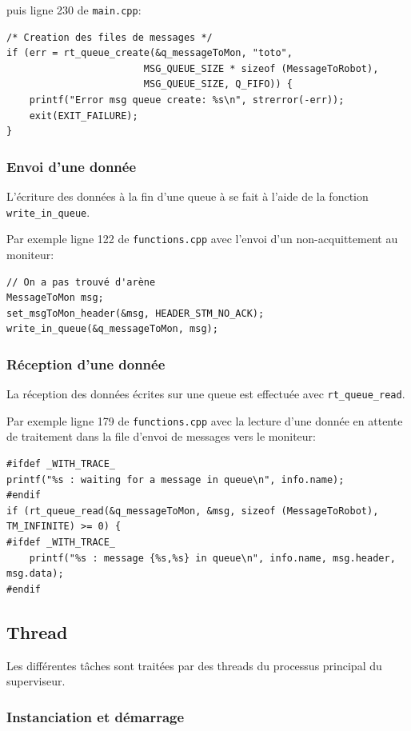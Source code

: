\documentclass[11pt, a4paper]{paper}
\begin{document}
puis ligne 230 de {\tt main.cpp}:
\begin{verbatim}
/* Creation des files de messages */
if (err = rt_queue_create(&q_messageToMon, "toto",
                        MSG_QUEUE_SIZE * sizeof (MessageToRobot),
                        MSG_QUEUE_SIZE, Q_FIFO)) {
    printf("Error msg queue create: %s\n", strerror(-err));
    exit(EXIT_FAILURE);
}
\end{verbatim}

\subsubsection{Envoi d’une donnée}
L'écriture des données à la fin d'une queue à se fait à l'aide de la fonction {\tt write\_in\_queue}.

Par exemple ligne 122 de {\tt functions.cpp} avec l'envoi d'un non-acquittement au moniteur:
\begin{verbatim}
// On a pas trouvé d'arène
MessageToMon msg;
set_msgToMon_header(&msg, HEADER_STM_NO_ACK);
write_in_queue(&q_messageToMon, msg);
\end{verbatim}

\subsubsection{Réception d’une donnée}
La réception des données écrites sur une queue est effectuée avec {\tt rt\_queue\_read}.

Par exemple ligne 179 de {\tt functions.cpp} avec la lecture d'une donnée en attente de traitement dans la file d'envoi de messages vers le moniteur:
\begin{verbatim}
#ifdef _WITH_TRACE_
printf("%s : waiting for a message in queue\n", info.name);
#endif
if (rt_queue_read(&q_messageToMon, &msg, sizeof (MessageToRobot), TM_INFINITE) >= 0) {
#ifdef _WITH_TRACE_
    printf("%s : message {%s,%s} in queue\n", info.name, msg.header, msg.data);
#endif
\end{verbatim}

\subsection{Thread}
Les différentes tâches sont traitées par des threads du processus principal du superviseur.

\subsubsection{Instanciation et démarrage}
\end{document}
